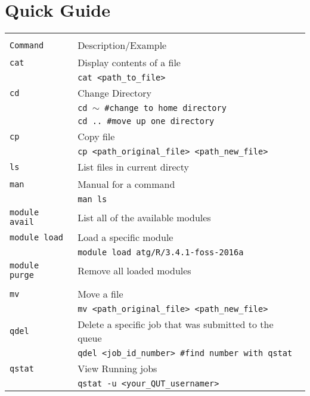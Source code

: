 \section{Quick Guide}

\begin{table}[!h]
  \begin{tabular}{ L{3cm}  L{9cm}}
    \hline
    \\
    \texttt{Command} & Description/Example \\
    \hline \hline
    \texttt{cat} & Display contents of a file \\
                     & \texttt{cat <path\_to\_file>}\\[2ex]
    
    \texttt{cd} & Change Directory
    \\
                     & \texttt{cd $\sim$   \#change to home directory}\\
                     & \texttt{cd ..  \#move up one directory}\\[2ex]
    \texttt{cp} & Copy file
    \\
                     &\texttt{cp <path\_original\_file> <path\_new\_file>}
    \\[2ex]
    \texttt{ls} & List files in current directy
    \\[4ex]
    \texttt{man} & Manual for a command\\
                     & \texttt{man ls}
    \\[2ex]
    \texttt{module avail} & List all of the available modules
    \\[4ex]
    \texttt{module load} & Load a specific module\\
                     & \texttt{module load atg/R/3.4.1-foss-2016a}    
    \\[2ex]
    \texttt{module purge} & Remove all loaded modules\\
    \\[2ex]
    \texttt{mv} & Move a file\\
                     &\texttt{mv <path\_original\_file> <path\_new\_file>}
    \\[2ex]
    \texttt{qdel} & Delete a specific job that was submitted to the queue\\
                     & \texttt{qdel <job\_id\_number> \#find number with qstat}
    \\[2ex]
    \texttt{qstat} & View Running jobs \\
                     & \texttt{qstat -u <your\_QUT\_usernamer>}

\end{tabular}
\end{table}
